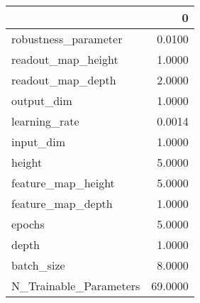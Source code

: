 \begin{tabular}{lr}
\toprule
{} &        0 \\
\midrule
robustness\_parameter   &   0.0100 \\
readout\_map\_height     &   1.0000 \\
readout\_map\_depth      &   2.0000 \\
output\_dim             &   1.0000 \\
learning\_rate          &   0.0014 \\
input\_dim              &   1.0000 \\
height                 &   5.0000 \\
feature\_map\_height     &   5.0000 \\
feature\_map\_depth      &   1.0000 \\
epochs                 &   5.0000 \\
depth                  &   1.0000 \\
batch\_size             &   8.0000 \\
N\_Trainable\_Parameters &  69.0000 \\
\bottomrule
\end{tabular}
